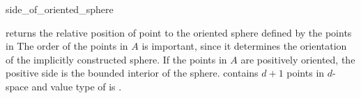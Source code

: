 \begin{ccRefFunction}{side_of_oriented_sphere}

{ returns the relative position of point  to the oriented
  sphere defined by the points in \ccc{A = tuple [first,last)} The
  order of the points in $A$ is important, since it determines the
  orientation of the implicitly constructed sphere.  If the points in
  $A$ are positively oriented, the positive side is the bounded 
  interior of the sphere.  
  \ccPrecond {} contains $d+1$ points in $d$-space and
  value type of  is .}

\end{ccRefFunction}

